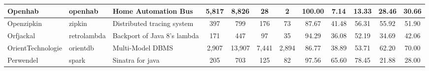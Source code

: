 \begin{landscape}
\begin{table}
\begin{tabular}{lllccccccccc}
Openhab                     & openhab                                                       & Home Automation Bus                                                      & 5,817           & 8,826            & 28                                                               & 2              & 100.00         & 7.14           & 13.33          & 28.46                                                             & 30.66                                                              \\ \hline
Openzipkin                  & zipkin                                                        & Distributed tracing system                                               & 397             & 799              & 176                                                              & 73             & 87.67          & 41.48          & 56.31          & 55.92                                                             & 51.90                                                              \\ \hline
Orfjackal                   & retrolambda                                                   & Backport of Java 8's lambda                                              & 171             & 447              & 97                                                               & 35             & 94.29          & 36.08          & 52.19          & 34.69                                                             & 42.06                                                              \\ \hline
OrientTechnologie           & orientdb                                                      & Multi-Model DBMS                                                         & 2,907           & 13,907           & 7,441                                                            & 2,894          & 86.77          & 38.89          & 53.71          & 62.20                                                             & 70.00                                                              \\ \hline
Perwendel                   & spark                                                         & Sinatra  for java                                                        & 205             & 703              & 125                                                              & 82             & 97.56          & 65.60          & 78.45          & 21.88                                                             & 28.00                                                              \\ \hline

\end{tabular}
\end{table}
\end{landscape}

